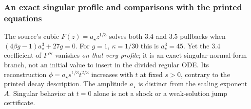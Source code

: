 \subsubsection{An exact singular profile and comparisons with the printed equations}

The source's cubic $F(z)=a_\star z^{1/3}$ solves both 3.4 and 3.5 pullbacks when
$(4\beta g-1)a_\star^3+27g=0$. For $g=1$, $\kappa=1/30$ this is $a_\star^3=45$.
Yet the 3.4 coefficient of $F'''$ vanishes \emph{on that very profile}; it
is an exact singular-normal-form branch, not an initial value to insert in
the divided regular ODE. Its reconstruction
$\phi=a_\star s^{1/3}t^{2/3}$ increases with $t$ at fixed $s>0$, contrary
to the printed decay description. The amplitude $a_\star$ is distinct from the scaling exponent $A$. Singular behavior at $t=0$ alone is not
a shock or a weak-solution jump certificate.

